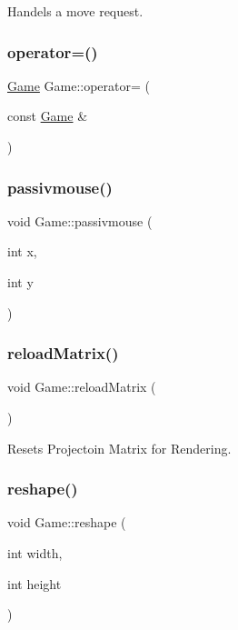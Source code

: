 Handels a move request. \mbox{\label{classGame_ad49ec11a59d863479784cac379ea47f1}} 
\subsubsection{\texorpdfstring{operator=()}{operator=()}}
{\footnotesize\ttfamily \hyperlink{classGame}{Game} Game\+::operator= (\begin{DoxyParamCaption}\item[{const \hyperlink{classGame}{Game} \&}]{ }\end{DoxyParamCaption})\hspace{0.3cm}{\ttfamily [private]}}

\mbox{\label{classGame_a542105a9f25169e14ca19a842d74789d}} 
\subsubsection{\texorpdfstring{passivmouse()}{passivmouse()}}
{\footnotesize\ttfamily void Game\+::passivmouse (\begin{DoxyParamCaption}\item[{int}]{x,  }\item[{int}]{y }\end{DoxyParamCaption})}

\mbox{\label{classGame_ad85b7db122d5d99f7a37021dbecd938a}} 
\subsubsection{\texorpdfstring{reload\+Matrix()}{reloadMatrix()}}
{\footnotesize\ttfamily void Game\+::reload\+Matrix (\begin{DoxyParamCaption}{ }\end{DoxyParamCaption})\hspace{0.3cm}{\ttfamily [private]}}

Resets Projectoin Matrix for Rendering. \mbox{\label{classGame_ac173432416c0c8d549080c50a2fddf71}} 
\subsubsection{\texorpdfstring{reshape()}{reshape()}}
{\footnotesize\ttfamily void Game\+::reshape (\begin{DoxyParamCaption}\item[{int}]{width,  }\item[{int}]{height }\end{DoxyParamCaption})}




